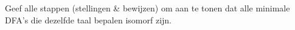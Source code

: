 \begin{question}
Geef alle stappen (stellingen \& bewijzen) om aan te tonen dat alle minimale DFA's die dezelfde taal bepalen isomorf zijn.
\end{question} 